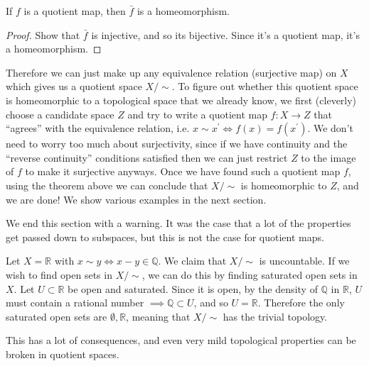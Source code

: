     \begin{corollary}
      If $f$ is a quotient map, then $\bar{f}$ is a homeomorphism. 
    \end{corollary}
    \begin{proof}
      Show that $\bar{f}$ is injective, and so its bijective. Since it's a quotient map, it's a homeomorphism. 
    \end{proof}

    Therefore we can just make up any equivalence relation (surjective map) on $X$ which gives us a quotient space $X/{\sim}$. To figure out whether this quotient space is homeomorphic to a topological space that we already know, we first (cleverly) choose a candidate space $Z$ and try to write a quotient map $f: X \rightarrow Z$ that ``agrees'' with the equivalence relation, i.e. $x \sim x^\prime \iff f(x) = f(x^\prime)$. We don't need to worry too much about surjectivity, since if we have continuity and the ``reverse continuity'' conditions satisfied then we can just restrict $Z$ to the image of $f$ to make it surjective anyways. Once we have found such a quotient map $f$, using the theorem above we can conclude that $X/{\sim}$ is homeomorphic to $Z$, and we are done! We show various examples in the next section. 

    We end this section with a warning. It was the case that a lot of the properties get passed down to subspaces, but this is not the case for quotient maps. 

    \begin{example}
      \label{quotient_trivial}
      Let $X = \mathbb{R}$ with $x \sim y \iff x - y \in \mathbb{Q}$. We claim that $X/{\sim}$ is uncountable. If we wish to find open sets in $X/{\sim}$, we can do this by finding saturated open sets in $X$. Let $U \subset \mathbb{R}$ be open and saturated. Since it is open, by the density of $\mathbb{Q}$ in $\mathbb{R}$, $U$ must contain a rational number $\implies \mathbb{Q} \subset U$, and so $U = \mathbb{R}$. Therefore the only saturated open sets are $\emptyset, \mathbb{R}$, meaning that $X/{\sim}$ has the trivial topology. 
    \end{example}

    This has a lot of consequences, and even very mild topological properties can be broken in quotient spaces.  

